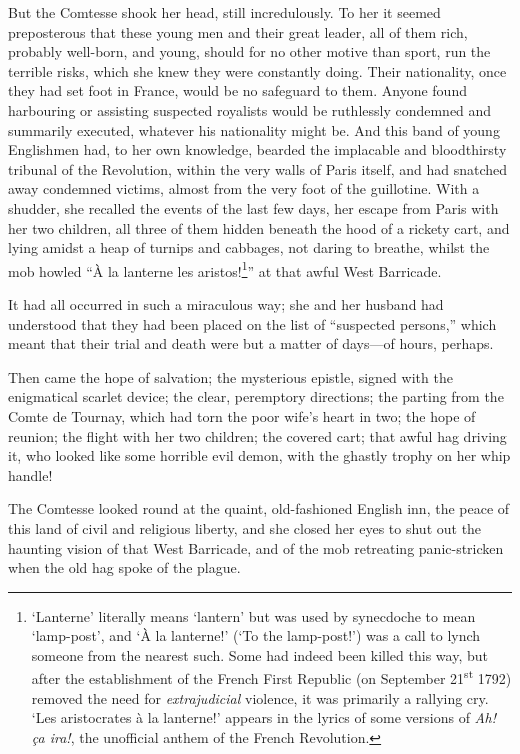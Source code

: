 \documentclass[paper=a5,BCOR=7mm,twoside,DIV=calc,12pt,usegeometry,chapterprefix,endperiod,headings=big]{scrbook}
\begin{document}
But the Comtesse shook her head, still incredulously. To her it seemed preposterous that these young men and their great leader, all of them rich, probably well-born, and young, should for no other motive than sport, run the terrible risks, which she knew they were constantly doing. Their nationality, once they had set foot in France, would be no safeguard to them. Anyone found harbouring or assisting suspected royalists would be ruthlessly condemned and summarily executed, whatever his nationality might be. And this band of young Englishmen had, to her own knowledge, bearded the implacable and bloodthirsty tribunal of the Revolution, within the very walls of Paris itself, and had snatched away condemned victims, almost from the very foot of the guillotine. With a shudder, she recalled the events of the last few days, her escape from Paris with her two children, all three of them hidden beneath the hood of a rickety cart, and lying amidst a heap of turnips and cabbages, not daring to breathe, whilst the mob howled \enquote{À la lanterne les aristos!\footnote{\enquote{Lanterne} literally means \enquote{lantern} but was used by synecdoche to mean  \enquote{lamp-post}, and \enquote{À la lanterne!} (\enquote{To the lamp-post!}) was a call to lynch someone from the nearest such. Some had indeed been killed this way, but after the establishment of the French First Republic (on September 21\textsuperscript{st} 1792) removed the need for \textit{extrajudicial} violence, it was primarily a rallying cry. \enquote{Les aristocrates à la lanterne!} appears in the lyrics of some versions of \textit{Ah! ça ira!}, the unofficial anthem of the French Revolution.}} at that awful West Barricade.

It had all occurred in such a miraculous way; she and her husband had understood that they had been placed on the list of \enquote{suspected persons,} which meant that their trial and death were but a matter of days---of hours, perhaps.

Then came the hope of salvation; the mysterious epistle, signed with the enigmatical scarlet device; the clear, peremptory directions; the parting from the Comte de Tournay, which had torn the poor wife's heart in two; the hope of reunion; the flight with her two children; the covered cart; that awful hag driving it, who looked like some horrible evil demon, with the ghastly trophy on her whip handle!

The Comtesse looked round at the quaint, old-fashioned English inn, the peace of this land of civil and religious liberty, and she closed her eyes to shut out the haunting vision of that West Barricade, and of the mob retreating panic-stricken when the old hag spoke of the plague.
\end{document}
